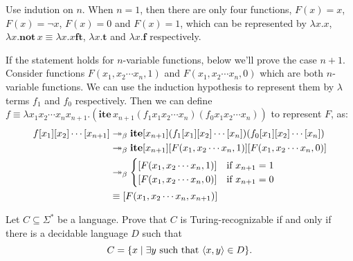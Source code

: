 \documentclass{homework}
\begin{document}
\begin{solution}
Use indution on $n$. When $n=1$, then there are only four functions, $F(x)=x$, $F(x)=\neg x$, $F(x)=0$ and $F(x)=1$, which can be represented by $\lambda x.x$, $\lambda x.\mathbf{not}\,x\equiv \lambda x.x\mathbf{ft}$, $\lambda x.\mathbf{t}$ and $\lambda x.\mathbf{f}$ respectively.

If the statement holds for $n$-variable functions, below we'll prove the case $n+1$. Consider functions $F(x_1,x_2\cdots x_n, 1)$ and $F(x_1,x_2\cdots x_n, 0)$ which are both $n$-variable functions. We can use the induction hypothesis to represent them by $\lambda$ terms $f_1$ and $f_0$ respectively. Then we can define $f\equiv \lambda x_1 x_2\cdots x_n x_{n+1}.(\mathbf{ite}\,x_{n+1}(f_1 x_1 x_2\cdots x_n)(f_0 x_1 x_2\cdots x_n))$ to represent $F$, as:
\begin{align*}
  f [x_{1}] [x_{2}] \cdots [x_{n+1}]&\twoheadrightarrow_{\beta} \mathbf{ite}[x_{n+1}](f_1 [x_{1}] [x_{2}] \cdots [x_{n}])(f_0 [x_{1}] [x_{2}] \cdots [x_{n}])\\&\twoheadrightarrow_{\beta} \mathbf{ite}[x_{n+1}][F(x_1,x_2\cdots x_n, 1)][F(x_1,x_2\cdots x_n, 0)]\\ &\twoheadrightarrow_{\beta}\begin{cases}
    [F(x_1,x_2\cdots x_n,1)] & \text{if } x_{n+1} = 1\\
    [F(x_1,x_2\cdots x_n,0)] & \text{if } x_{n+1} = 0
  \end{cases}\\ &\equiv [F(x_1,x_2\cdots x_n,x_{n+1})]
\end{align*}
\end{solution}

\begin{problem}
  Let $C \subseteq \Sigma^{*}$ be a language.
  Prove that $C$ is Turing-recognizable if and only if there is a decidable language $D$
  such that
  \begin{equation*}
    C = \{ x \mid \exists y \text{ such that } \langle x,y\rangle \in D\}.
  \end{equation*}
\end{problem}
\end{document}
